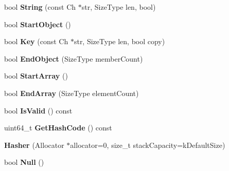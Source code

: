 \begin{DoxyCompactItemize}
\item 
bool {\bfseries String} (const Ch $\ast$str, Size\+Type len, bool)\hypertarget{classinternal_1_1_hasher_a885f2bf42f2bb64d6f9443129dce3883}{}\label{classinternal_1_1_hasher_a885f2bf42f2bb64d6f9443129dce3883}

\item 
bool {\bfseries Start\+Object} ()\hypertarget{classinternal_1_1_hasher_a1607d6cac3daab9725e442e38d121028}{}\label{classinternal_1_1_hasher_a1607d6cac3daab9725e442e38d121028}

\item 
bool {\bfseries Key} (const Ch $\ast$str, Size\+Type len, bool copy)\hypertarget{classinternal_1_1_hasher_a1b34d88f85f9c6a739c1f9038f14f078}{}\label{classinternal_1_1_hasher_a1b34d88f85f9c6a739c1f9038f14f078}

\item 
bool {\bfseries End\+Object} (Size\+Type member\+Count)\hypertarget{classinternal_1_1_hasher_a7050f1552d88967944195163a6a0b08e}{}\label{classinternal_1_1_hasher_a7050f1552d88967944195163a6a0b08e}

\item 
bool {\bfseries Start\+Array} ()\hypertarget{classinternal_1_1_hasher_a2ceb3cc00216f6b6ce66907856a16404}{}\label{classinternal_1_1_hasher_a2ceb3cc00216f6b6ce66907856a16404}

\item 
bool {\bfseries End\+Array} (Size\+Type element\+Count)\hypertarget{classinternal_1_1_hasher_ad445b2730be23e18b4dec2c4d1033419}{}\label{classinternal_1_1_hasher_ad445b2730be23e18b4dec2c4d1033419}

\item 
bool {\bfseries Is\+Valid} () const \hypertarget{classinternal_1_1_hasher_abd4cb8325b81217dc34eecf63d47579f}{}\label{classinternal_1_1_hasher_abd4cb8325b81217dc34eecf63d47579f}

\item 
uint64\+\_\+t {\bfseries Get\+Hash\+Code} () const \hypertarget{classinternal_1_1_hasher_ad44fcaf9a12fefb387e9624327572b61}{}\label{classinternal_1_1_hasher_ad44fcaf9a12fefb387e9624327572b61}

\item 
{\bfseries Hasher} (Allocator $\ast$allocator=0, size\+\_\+t stack\+Capacity=k\+Default\+Size)\hypertarget{classinternal_1_1_hasher_a7b6abfdd3bdc60064a2322cdd20708c1}{}\label{classinternal_1_1_hasher_a7b6abfdd3bdc60064a2322cdd20708c1}

\item 
bool {\bfseries Null} ()\hypertarget{classinternal_1_1_hasher_a57c656866aa08cc7c448ce47b7a243c3}{}\label{classinternal_1_1_hasher_a57c656866aa08cc7c448ce47b7a243c3}


\end{DoxyCompactItemize}
